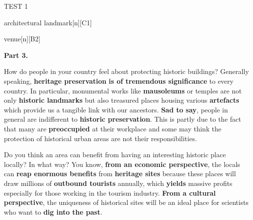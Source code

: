 \begin{glossarymc}[Cambridge 4]
\begin{test}{TEST 1}
\begin{VocabExplain}[Part 2]
			\begin{ExplainCard}{architectural landmark}[n][C1]
			\end{ExplainCard}

			\begin{ExplainCard}{venue}[n][B2]
			\end{ExplainCard}

        \end{VocabExplain}

    \noindent
    \textbf{Part 3.}

	\begin{qa}{How do people in your country feel about protecting historic buildings?}
	Generally speaking, \textbf{heritage preservation} \textbf{is of tremendous significance} to every country. In particular, monumental works like \textbf{mausoleums} or temples are not only \textbf{historic landmarks} but also treasured places housing various \textbf{artefacts} which provide us a tangible link with our ancestors. \textbf{Sad to say}, people in general are indifferent to \textbf{historic preservation}. This is partly due to the fact that many are \textbf{preoccupied} at their workplace and some may think the protection of historical urban areas are not their responsibilities.
	\end{qa}

	\begin{qa}{Do you think an area can benefit from having an interesting historic place locally? In what way?}
	You know, \textbf{from an economic perspective}, the locals can \textbf{reap enormous benefits} from \textbf{heritage sites} because these places will draw millions of \textbf{outbound tourists} annually, which \textbf{yields} massive profits especially for those working in the tourism industry. \textbf{From a cultural perspective}, the uniqueness of historical sites will be an ideal place for scientists who want to \textbf{dig into the past}.
	\end{qa}


\end{test}
\end{glossarymc}
